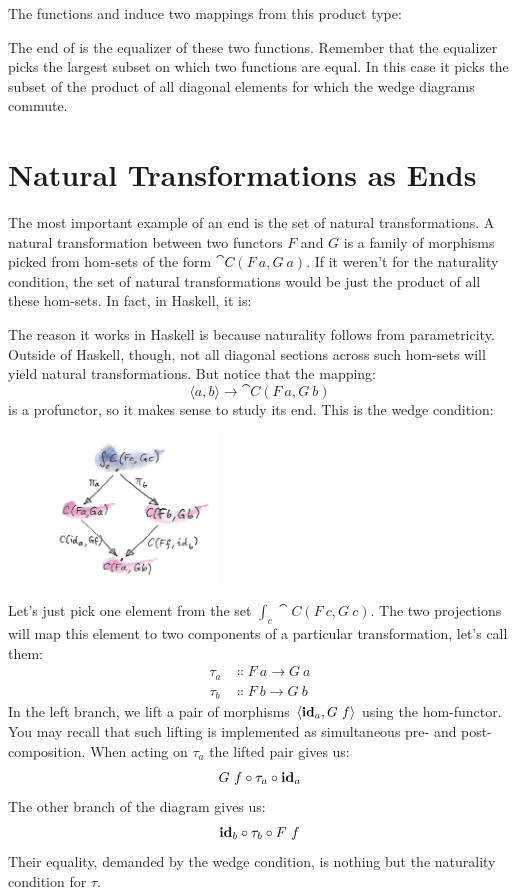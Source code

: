 The functions  and  induce two mappings from
this product type:

The end of  is the equalizer of these two functions. Remember
that the equalizer picks the largest subset on which two functions are
equal. In this case it picks the subset of the product of all diagonal
elements for which the wedge diagrams commute.

\section{Natural Transformations as Ends}

The most important example of an end is the set of natural
transformations. A natural transformation between two functors
$F$ and $G$ is a family of morphisms picked from hom-sets
of the form $\cat{C}(F\ a, G\ a)$. If it weren't for the naturality
condition, the set of natural transformations would be just the product
of all these hom-sets. In fact, in Haskell, it is:

The reason it works in Haskell is because naturality follows from
parametricity. Outside of Haskell, though, not all diagonal sections
across such hom-sets will yield natural transformations. But notice that
the mapping:
\[\langle a, b \rangle \to \cat{C}(F\ a, G\ b)\]
is a profunctor, so it makes sense to study its end. This is the wedge
condition:

\begin{figure}[H]
\centering
\includegraphics[width=0.4\textwidth]{images/end1.jpg}
\end{figure}

\noindent
Let's just pick one element from the set $\int_c \cat{C}(F\ c, G\ c)$.
The two projections will map this element to two components of a
particular transformation, let's call them:
\begin{align*}
\tau_a &\Colon F\ a \to G\ a \\
\tau_b &\Colon F\ b \to G\ b
\end{align*}
In the left branch, we lift a pair of morphisms
$\langle \idarrow[a], G\ f \rangle$ using the hom-functor. You
may recall that such lifting is implemented as simultaneous pre- and
post-composition. When acting on $\tau_a$ the lifted pair gives us:
\[G\ f \circ \tau_a \circ \idarrow[a]\]
The other branch of the diagram gives us:
\[\idarrow[b] \circ \tau_b \circ F\ f\]
Their equality, demanded by the wedge condition, is nothing but the
naturality condition for $\tau$.


